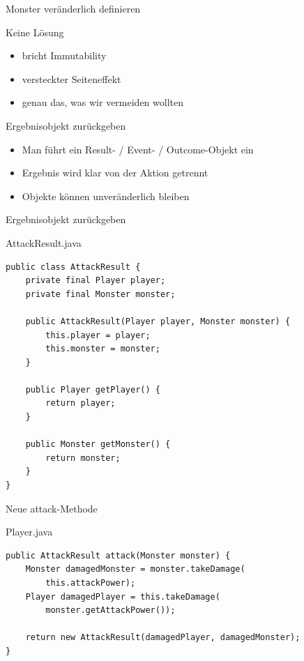 \begin{frame}{Monster veränderlich definieren}
	\begin{alertblock}{Keine Lösung}
		\begin{itemize}
		  \item bricht Immutability
		  \item versteckter Seiteneffekt
		  \item genau das, was wir vermeiden wollten
		\end{itemize}	
	\end{alertblock}
\end{frame}

\begin{frame}{Ergebnisobjekt zurückgeben}
	\begin{itemize}
	  \item Man führt ein Result- / Event- / Outcome-Objekt ein
	  \item Ergebnis wird klar von der Aktion getrennt
	  \item Objekte können unveränderlich bleiben
	\end{itemize}	
\end{frame}

\begin{frame}[fragile]{Ergebnisobjekt zurückgeben}
	\begin{exampleblock}{AttackResult.java}
		\begin{lstlisting}
public class AttackResult {
    private final Player player;
    private final Monster monster;

    public AttackResult(Player player, Monster monster) {
        this.player = player;
        this.monster = monster;
    }

    public Player getPlayer() {
        return player;
    }

    public Monster getMonster() {
        return monster;
    }
}		
		\end{lstlisting}
	\end{exampleblock}
\end{frame}

\begin{frame}[fragile]{Neue attack-Methode}
	\begin{exampleblock}{Player.java}
		\begin{lstlisting}
public AttackResult attack(Monster monster) {
    Monster damagedMonster = monster.takeDamage(
    	this.attackPower);
    Player damagedPlayer = this.takeDamage(
    	monster.getAttackPower());

    return new AttackResult(damagedPlayer, damagedMonster);
}		
		\end{lstlisting}
	\end{exampleblock}
\end{frame}

